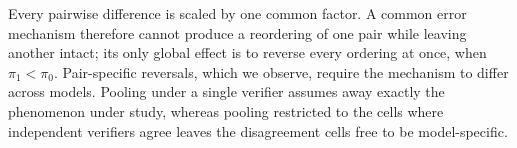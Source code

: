 Every pairwise difference is scaled by one common factor. A common error mechanism therefore
cannot produce a reordering of one pair while leaving another intact; its only global effect
is to reverse every ordering at once, when $\pi_1 < \pi_0$. Pair-specific reversals, which we
observe, require the mechanism to differ across models. Pooling under a single verifier
assumes away exactly the phenomenon under study, whereas pooling restricted to the cells where
independent verifiers agree leaves the disagreement cells free to be model-specific.
